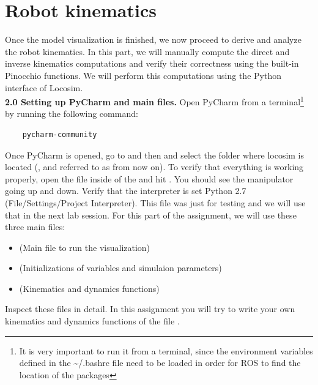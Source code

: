 \documentclass[11pt]{article}
\begin{document}
\section{Robot kinematics}
Once the model visualization is finished, we now proceed to derive and analyze the robot kinematics. In this part, we will manually compute the direct and inverse kinematics computations and verify their correctness using the built-in Pinocchio functions. We will perform this computations using the Python interface of Locosim. \\





\textbf{2.0 Setting up PyCharm and main files.} Open PyCharm from a terminal\footnote{It is very important to run it from a terminal, since the environment variables defined in the \textasciitilde/.bashrc file need to be loaded in order for ROS to find the location of the packages} by running the following command:
%
\begin{verbatim}
	pycharm-community
\end{verbatim}
%
Once PyCharm is opened, go to  and then  and select the folder where locosim is located (, and referred to as  from now on). To verify that everything is working properly, open the file   inside of the  and hit . You should see the manipulator going up and down. 
Verify that the interpreter is set Python 2.7 (File/Settings/Project Interpreter).
This file was just for testing and we will use that in  the next lab session.
%
%
For this part of the assignment, we will use these three main files: 
\begin{itemize}
	\item {} (Main file to run the visualization)
	\item {} (Initializations of variables and simulaion parameters)
	\item {} (Kinematics and dynamics functions)
\end{itemize}
Inspect these files in detail. In this assignment you will try to write your own kinematics and dynamics functions of the file .\\
\end{document}
